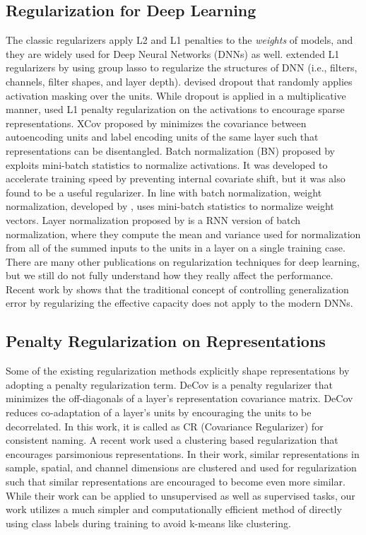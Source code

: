 \documentclass[letterpaper]{article} %
\begin{document}
\subsection{Regularization for Deep Learning}
%
The classic regularizers apply L2 \cite{hoerl1970ridge} and L1 \cite{tibshirani1996regression} 
penalties to the \textit{weights} of models, and they are widely used for Deep Neural Networks (DNNs) as well. 
%
\cite{wen2016learning} extended L1 regularizers by using group lasso to regularize 
the structures of DNN (i.e., filters, channels, filter shapes, and layer depth).
%
\cite{srivastava2014dropout} devised dropout that randomly applies activation masking 
over the units.
%
While dropout is applied in a multiplicative manner, \cite{glorot2011deep} used L1 penalty 
regularization on the activations to encourage sparse representations.
%
XCov proposed by \cite{cheung2014discovering} minimizes the covariance between 
autoencoding units and label encoding units of the same layer such that 
representations can be disentangled.  
%
Batch normalization (BN) proposed by \cite{ioffe2015batch} exploits mini-batch statistics 
to normalize activations. It was developed to accelerate training speed by preventing 
internal covariate shift, but it was also found to be a useful regularizer.
%
In line with batch normalization, weight normalization, developed by \cite{salimans2016weight}, 
uses mini-batch statistics to normalize weight vectors. 
%
Layer normalization proposed by \cite{ba2016layer} is a RNN version of batch normalization,
where they compute the mean and variance used for normalization from all of the summed
inputs to the units in a layer on a single training case.
%
There are many other publications on regularization techniques for deep learning,
but we still do not fully understand how they really affect the performance.  
Recent work by \cite{zhang2016understanding}
shows that the traditional concept of controlling generalization error by regularizing the effective capacity does not apply to the modern DNNs. 


\subsection{Penalty Regularization on Representations}
Some of the existing regularization methods explicitly shape representations by adopting a penalty regularization term.
%
DeCov \cite{cogswell2015reducing} is a penalty regularizer that minimizes the off-diagonals of a layer's representation covariance matrix. DeCov reduces co-adaptation of a layer's units by encouraging the units to be decorrelated. In this work, 
it is called as CR (Covariance Regularizer) for consistent naming.
%
A recent work \cite{liao2016learning} used a clustering based regularization that encourages parsimonious representations. In their work, similar representations in sample, spatial, and channel dimensions are clustered and used for regularization such that similar representations are encouraged to become even more similar. While their work can be applied to unsupervised as well as supervised tasks, our work utilizes a much simpler and computationally efficient method of directly using class labels during training to avoid k-means like clustering. 
\end{document}
